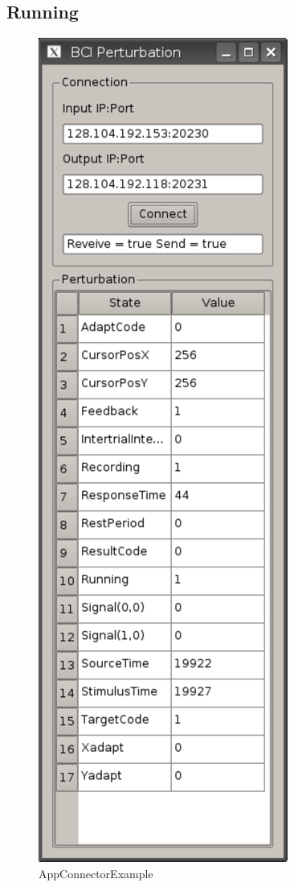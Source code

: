 \subsection{Running}
 \begin{figure}
\begin{center}
 \includegraphics[scale=0.5]{appconnect}
\end{center}

\caption{AppConnectorExample}
\end{figure} 

